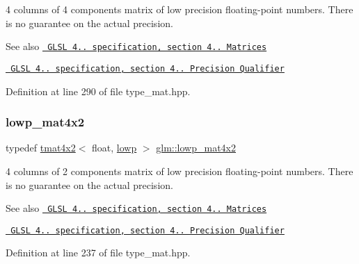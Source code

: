 4 columns of 4 components matrix of low precision floating-\/point numbers. There is no guarantee on the actual precision.

\begin{DoxySeeAlso}{See also}
\href{http://www.opengl.org/registry/doc/GLSLangSpec.4.20.8.pdf}{\texttt{ G\+L\+SL 4.. specification, section 4.. Matrices}} 

\href{http://www.opengl.org/registry/doc/GLSLangSpec.4.20.8.pdf}{\texttt{ G\+L\+SL 4.. specification, section 4.. Precision Qualifier}} 
\end{DoxySeeAlso}


Definition at line 290 of file type\+\_\+mat.\+hpp.

\mbox{\label{group__core__precision_gaae545974fa5b7fcb9574ea67f8922c50}} 
\subsubsection{\texorpdfstring{lowp\_mat4x2}{lowp\_mat4x2}}
{\footnotesize\ttfamily typedef \mbox{\hyperlink{structglm_1_1tmat4x2}{tmat4x2}}$<$ float, \mbox{\hyperlink{namespaceglm_a0f04f086094c747d227af4425893f545ae161af3fc695e696ce3bf69f7332bc2d}{lowp}} $>$ \mbox{\hyperlink{group__core__precision_gaae545974fa5b7fcb9574ea67f8922c50}{glm\+::lowp\+\_\+mat4x2}}}

4 columns of 2 components matrix of low precision floating-\/point numbers. There is no guarantee on the actual precision.

\begin{DoxySeeAlso}{See also}
\href{http://www.opengl.org/registry/doc/GLSLangSpec.4.20.8.pdf}{\texttt{ G\+L\+SL 4.. specification, section 4.. Matrices}} 

\href{http://www.opengl.org/registry/doc/GLSLangSpec.4.20.8.pdf}{\texttt{ G\+L\+SL 4.. specification, section 4.. Precision Qualifier}} 
\end{DoxySeeAlso}


Definition at line 237 of file type\+\_\+mat.\+hpp.

\mbox{\label{group__core__precision_ga4649624907ac00347237476ead4178e1}} 
